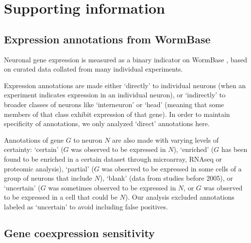 \documentclass[10pt,letterpaper]{article}
\begin{document}
{%

\newpage
\section*{Supporting information}
\setcounter{figure}{0} \renewcommand{\thefigure}{S\arabic{figure}}
\renewcommand{\thefigure}{S\arabic{figure}}

\subsection*{Expression annotations from WormBase}

Neuronal gene expression is measured as a binary indicator on WormBase \cite{Harris:2009kd}, based on curated data collated from many individual experiments.

Expression annotations are made either `directly' to individual neurons (when an experiment indicates expression in an individual neuron), or `indirectly' to broader classes of neurons like `interneuron' or `head' (meaning that some members of that class exhibit expression of that gene).
In order to maintain specificity of annotations, we only analyzed `direct' annotations here.

Annotations of gene $G$ to neuron $N$ are also made with varying levels of certainty:
`certain' ($G$ was observed to be expressed in $N$),
`enriched' ($G$ has been found to be enriched in a certain dataset through microarray, RNAseq or proteomic analysis),
`partial' ($G$ was observed to be expressed in some cells of a group of neurons that include $N$),
`blank' (data from studies before 2005),
or `uncertain' ($G$ was sometimes observed to be expressed in $N$, or $G$ was observed to be expressed in a cell that could be $N$).
Our analysis excluded annotations labeled as `uncertain' to avoid including false positives.

\subsection*{Gene coexpression sensitivity}

}
\end{document}
